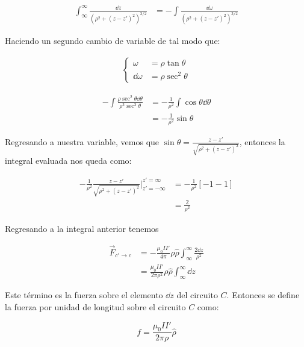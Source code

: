 \documentclass[11pt]{report}
\theoremstyle{plain}
\theoremstyle{definition}
\begin{document}
\begin{align*}
	\int_\infty^\infty \frac{\dd{z}}{(\rho^2 + (z-z')^2)^{3/2}} &= -\int \frac{\dd{\omega}}{(\rho^2 + (z-z')^2)^{3/2}}
\end{align*}

Haciendo un segundo cambio de variable de tal modo que:

\begin{align*}
	\begin{cases}
		\omega &= \rho \tan{\theta}\\
		\dd{\omega} &= \rho \sec^2{\theta}
	\end{cases}
\end{align*}


\begin{align*}
	-\int \frac{\rho \sec^2{\theta}\dd{\theta}}{\rho^3\sec^3{\theta}}&= -\frac{1}{\rho^2} \int \cos{\theta}\dd{\theta} \\
	&= -\frac{1}{\rho^2}\sin{\theta}
\end{align*}

Regresando a nuestra variable, vemos que $\sin{\theta} = \frac{z-z'}{\sqrt{\rho^2 + (z-z')^2}}$, entonces la integral evaluada nos queda como:

\begin{align*}
	-\frac{1}{\rho^2} \frac{z-z'}{\sqrt{\rho^2 + (z-z')^2}}|^{z' = \infty}_{z' = -\infty} &= -\frac{1}{\rho^2}[-1-1]\\
	&= \frac{2}{\rho^2}
\end{align*}

Regresando a la integral anterior tenemos

\begin{align*}
	\vec{F}_{c'\rightarrow c} &= -\frac{\mu_0II'}{4\pi}\rho\hat{\rho}\int^\infty_\infty \frac{2\dd{z}}{\rho^2}\\
	&= \frac{\mu_0II'}{2\pi\rho^2}\rho\hat{\rho}\int^\infty_\infty \dd{z}
\end{align*}


Este término es la fuerza sobre el elemento $\dd{z}$ del circuito $C$. Entonces se define la fuerza por unidad de longitud sobre el circuito $C$ como:


\begin{equation} %
	f = \frac{\mu_0II'}{2\pi\rho}\hat{\rho}
	\label{eq:fuerza_por_unidad_de_longitud}
\end{equation}



\end{document}
